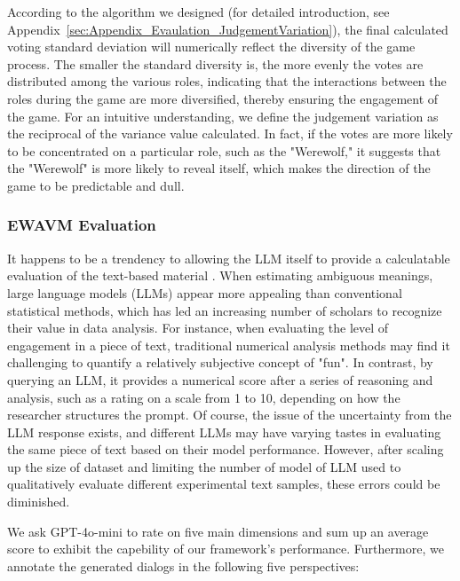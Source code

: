 According to the algorithm we designed (for detailed introduction, see Appendix~\ref{sec:Appendix_Evaulation_JudgementVariation}), the final calculated voting standard deviation will numerically reflect the diversity of the game process. The smaller the standard diversity is, the more evenly the votes are distributed among the various roles, indicating that the interactions between the roles during the game are more diversified, thereby ensuring the engagement of the game. For an intuitive understanding, we define the judgement variation as the reciprocal of the variance value calculated. In fact, if the votes are more likely to be concentrated on a particular role, such as the "Werewolf," it suggests that the "Werewolf" is more likely to reveal itself, which makes the direction of the game to be predictable and dull.


\subsubsection{EWAVM Evaluation} \label{sec:Evaluation_EWAVM}

It happens to be a trendency to allowing the LLM itself to provide a calculatable evaluation of the text-based material \citep{shao2023character,wang2024incharacter}. When estimating ambiguous meanings, large language models (LLMs) appear more appealing than conventional statistical methods, which has led an increasing number of scholars to recognize their value in data analysis. For instance, when evaluating the level of engagement in a piece of text, traditional numerical analysis methods may find it challenging to quantify a relatively subjective concept of "fun". In contrast, by querying an LLM, it provides a numerical score after a series of reasoning and analysis, such as a rating on a scale from 1 to 10, depending on how the researcher structures the prompt. Of course, the issue of the uncertainty from the LLM response exists, and different LLMs may have varying tastes in evaluating the same piece of text based on their model performance. However, after scaling up the size of dataset and limiting the number of model of LLM used to qualitatively evaluate different experimental text samples, these errors could be diminished.


We ask GPT-4o-mini to rate on five main dimensions and sum up an average score to exhibit the capebility of our framework's performance. Furthermore, we annotate the generated dialogs in the following five perspectives:

